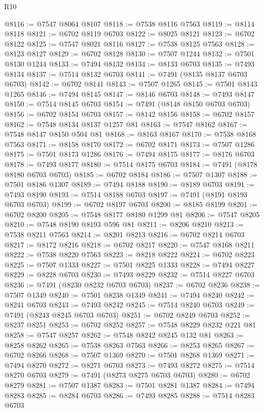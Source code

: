 \begin{lexlean}{R10}
\begin{coremodule}
@8116 := @7547 @8064 @8107
@8118 := @7538 @8116 @7563
@8119 := @8114 @8118
@8121 := @6702 @8119 @6703
@8122 := @8025 @8121
@8123 := @6702 @8122
@8125 := @7547 @8021 @8116
@8127 := @7538 @8125 @7563
@8128 := @8123 @8127
@8129 := @6702 @8128
@8130 := @7507 @1244
@8132 := @7501 @8130 @1244
@8133 := @7494 @8132
@8134 := @8133 @6703
@8135 := @7493 @8134
@8137 := @7514 @8132 @6703
@8141 := @7491 (@8135 @8137 @6703 @6703)
@8142 := @6702 @8141
@8143 := @7507 @1265
@8145 := @7501 @8143 @1265
@8146 := @7494 @8145
@8147 := @8146 @6703
@8148 := @7493 @8147
@8150 := @7514 @8145 @6703
@8154 := @7491 (@8148 @8150 @6703 @6703)
@8156 := @6702 @8154 @6703
@8157 := @8142 @8156
@8158 := @6702 @8157
@8162 := @7548 @8134 @8137 @1257 @81
@8163 := @7547 @8162
@8167 := @7548 @8147 @8150 @504 @81
@8168 := @8163 @8167
@8170 := @7538 @8168 @7563
@8171 := @8158 @8170
@8172 := @6702 @8171
@8173 := @7507 @1286
@8175 := @7501 @8173 @1286
@8176 := @7494 @8175
@8177 := @8176 @6703
@8178 := @7493 @8177
@8180 := @7514 @8175 @6703
@8184 := @7491 (@8178 @8180 @6703 @6703)
@8185 := @6702 @8184
@8186 := @7507 @1307
@8188 := @7501 @8186 @1307
@8189 := @7494 @8188
@8190 := @8189 @6703
@8191 := @7493 @8190
@8193 := @7514 @8188 @6703
@8197 := @7491 (@8191 @8193 @6703 @6703)
@8199 := @6702 @8197 @6703
@8200 := @8185 @8199
@8201 := @6702 @8200
@8205 := @7548 @8177 @8180 @1299 @81
@8206 := @7547 @8205
@8210 := @7548 @8190 @8193 @596 @81
@8211 := @8206 @8210
@8213 := @7538 @8211 @7563
@8214 := @8201 @8213
@8216 := @6702 @8214 @6703
@8217 := @8172 @8216
@8218 := @6702 @8217
@8220 := @7547 @8168 @8211
@8222 := @7538 @8220 @7563
@8223 := @8218 @8222
@8224 := @6702 @8223
@8225 := @7507 @1333
@8227 := @7501 @8225 @1333
@8228 := @7494 @8227
@8229 := @8228 @6703
@8230 := @7493 @8229
@8232 := @7514 @8227 @6703
@8236 := @7491 (@8230 @8232 @6703 @6703)
@8237 := @6702 @8236
@8238 := @7507 @1349
@8240 := @7501 @8238 @1349
@8241 := @7494 @8240
@8242 := @8241 @6703
@8243 := @7493 @8242
@8245 := @7514 @8240 @6703
@8249 := @7491 (@8243 @8245 @6703 @6703)
@8251 := @6702 @8249 @6703
@8252 := @8237 @8251
@8253 := @6702 @8252
@8257 := @7548 @8229 @8232 @221 @81
@8258 := @7547 @8257
@8262 := @7548 @8242 @8245 @132 @81
@8263 := @8258 @8262
@8265 := @7538 @8263 @7563
@8266 := @8253 @8265
@8267 := @6702 @8266
@8268 := @7507 @1369
@8270 := @7501 @8268 @1369
@8271 := @7494 @8270
@8272 := @8271 @6703
@8273 := @7493 @8272
@8275 := @7514 @8270 @6703
@8279 := @7491 (@8273 @8275 @6703 @6703)
@8280 := @6702 @8279
@8281 := @7507 @1387
@8283 := @7501 @8281 @1387
@8284 := @7494 @8283
@8285 := @8284 @6703
@8286 := @7493 @8285
@8288 := @7514 @8283 @6703

\end{coremodule}
\end{lexlean}
